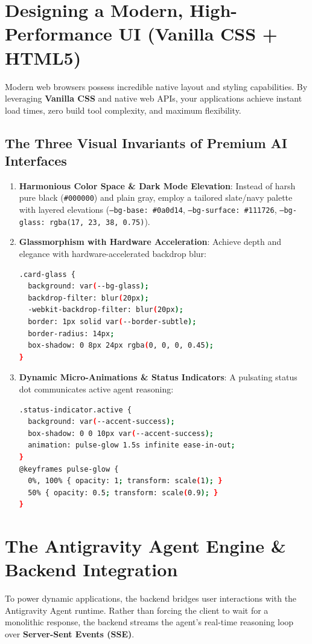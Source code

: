 \documentclass[11pt,a4paper,oneside]{book}
\begin{document}
\section{Designing a Modern, High-Performance UI (Vanilla CSS + HTML5)}
Modern web browsers possess incredible native layout and styling capabilities. By leveraging \textbf{Vanilla CSS} and native web APIs, your applications achieve instant load times, zero build tool complexity, and maximum flexibility.

\subsection{The Three Visual Invariants of Premium AI Interfaces}
\begin{enumerate}
    \item \textbf{Harmonious Color Space \& Dark Mode Elevation}: Instead of harsh pure black (\texttt{\#000000}) and plain gray, employ a tailored slate/navy palette with layered elevations (\texttt{--bg-base: \#0a0d14}, \texttt{--bg-surface: \#111726}, \texttt{--bg-glass: rgba(17, 23, 38, 0.75)}).
    \item \textbf{Glassmorphism with Hardware Acceleration}: Achieve depth and elegance with hardware-accelerated backdrop blur:
\begin{lstlisting}[language=bash]
.card-glass {
  background: var(--bg-glass);
  backdrop-filter: blur(20px);
  -webkit-backdrop-filter: blur(20px);
  border: 1px solid var(--border-subtle);
  border-radius: 14px;
  box-shadow: 0 8px 24px rgba(0, 0, 0, 0.45);
}
\end{lstlisting}
    \item \textbf{Dynamic Micro-Animations \& Status Indicators}: A pulsating status dot communicates active agent reasoning:
\begin{lstlisting}[language=bash]
.status-indicator.active {
  background: var(--accent-success);
  box-shadow: 0 0 10px var(--accent-success);
  animation: pulse-glow 1.5s infinite ease-in-out;
}
@keyframes pulse-glow {
  0%, 100% { opacity: 1; transform: scale(1); }
  50% { opacity: 0.5; transform: scale(0.9); }
}
\end{lstlisting}
\end{enumerate}

\section{The Antigravity Agent Engine \& Backend Integration}
To power dynamic applications, the backend bridges user interactions with the Antigravity Agent runtime. Rather than forcing the client to wait for a monolithic response, the backend streams the agent's real-time reasoning loop over \textbf{Server-Sent Events (SSE)}.
\end{document}
